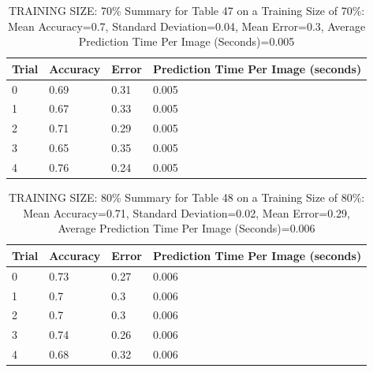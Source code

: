 \documentclass{article}
\begin{document}
\begin{table}[H]

\centering
{\begin{tabular}{||p{1cm}|p{1.8cm}|p{1.8cm}|p{3cm}||}
 \hline
Trial & Accuracy & Error & Prediction Time Per Image (seconds) \\ [0.5ex] 
 \hline\hline
    0  & 0.69  & 0.31  & 0.005\\
\hline
    1  & 0.67  & 0.33  & 0.005\\
\hline
    2  & 0.71  & 0.29  & 0.005\\
\hline
    3  & 0.65  & 0.35  & 0.005\\
\hline
    4  & 0.76  & 0.24  & 0.005\\
\hline

\end{tabular}}
\caption{TRAINING SIZE: 70\% \newline Summary for Table 47 on a Training Size of 70\%: Mean Accuracy=0.7, Standard Deviation=0.04, Mean Error=0.3, Average Prediction Time Per Image (Seconds)=0.005}
\end{table} 

\begin{table}[H]

\centering
{\begin{tabular}{||p{1cm}|p{1.8cm}|p{1.8cm}|p{3cm}||}
 \hline
Trial & Accuracy & Error & Prediction Time Per Image (seconds) \\ [0.5ex] 
 \hline\hline
    0  & 0.73  & 0.27  & 0.006\\
\hline
    1  & 0.7  & 0.3  & 0.006\\
\hline
    2  & 0.7  & 0.3  & 0.006\\
\hline
    3  & 0.74  & 0.26  & 0.006\\
\hline
    4  & 0.68  & 0.32  & 0.006\\
\hline

\end{tabular}}
\caption{TRAINING SIZE: 80\% \newline Summary for Table 48 on a Training Size of 80\%: Mean Accuracy=0.71, Standard Deviation=0.02, Mean Error=0.29, Average Prediction Time Per Image (Seconds)=0.006}
\end{table} 
\end{document}
